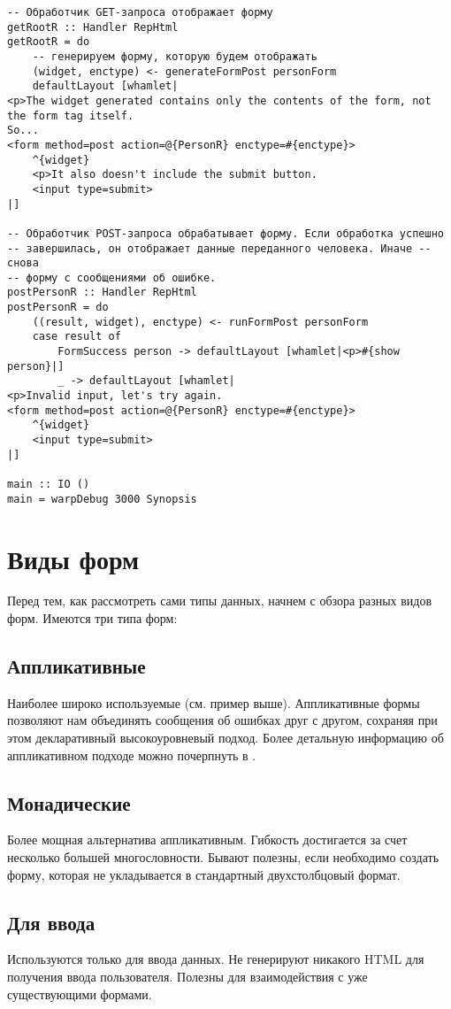 \begin{lstlisting}
-- Обработчик GET-запроса отображает форму
getRootR :: Handler RepHtml
getRootR = do
    -- генерируем форму, которую будем отображать
    (widget, enctype) <- generateFormPost personForm
    defaultLayout [whamlet|
<p>The widget generated contains only the contents of the form, not the form tag itself.
So...
<form method=post action=@{PersonR} enctype=#{enctype}>
    ^{widget}
    <p>It also doesn't include the submit button.
    <input type=submit>
|]

-- Обработчик POST-запроса обрабатывает форму. Если обработка успешно 
-- завершилась, он отображает данные переданного человека. Иначе -- снова
-- форму с сообщениями об ошибке.
postPersonR :: Handler RepHtml
postPersonR = do
    ((result, widget), enctype) <- runFormPost personForm
    case result of
        FormSuccess person -> defaultLayout [whamlet|<p>#{show person}|]
        _ -> defaultLayout [whamlet|
<p>Invalid input, let's try again.
<form method=post action=@{PersonR} enctype=#{enctype}>
    ^{widget}
    <input type=submit>
|]

main :: IO ()
main = warpDebug 3000 Synopsis
\end{lstlisting}

\section{Виды форм}
Перед тем, как рассмотреть сами типы данных, начнем с обзора разных видов форм. Имеются
три типа
форм:

\subsection{Аппликативные}
Наиболее широко используемые (см. пример выше). Аппликативные формы
позволяют нам объединять сообщения об ошибках друг с другом, сохраняя при этом
декларативный высокоуровневый подход. Более детальную информацию об аппликативном подходе
можно почерпнуть в 
.

\subsection{Монадические}
Более мощная альтернатива аппликативным. Гибкость достигается за счет несколько большей
многословности. Бывают полезны, если необходимо создать форму, которая не укладывается в
стандартный двухстолбцовый формат.

\subsection{Для ввода}
Используются только для ввода данных. Не генерируют никакого HTML для получения ввода
пользователя. Полезны для взаимодействия с уже существующими формами.


